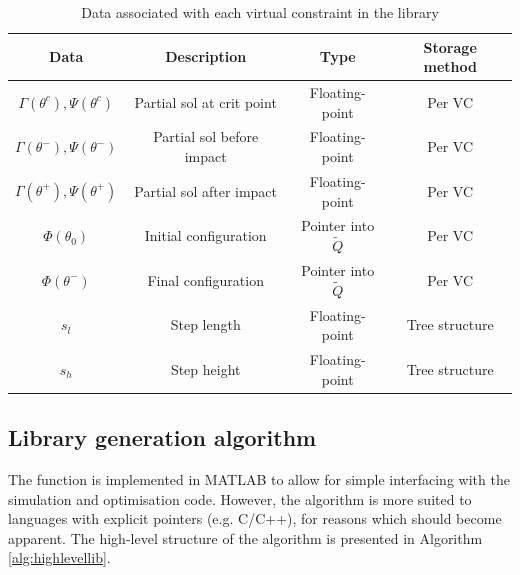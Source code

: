 \begin{table}
	\centering
	\begin{tabular}{ c | c | c | c }
		Data                               & Description               & Type                      & Storage method \\ \hline
		$\Gamma(\theta^c), \Psi(\theta^c)$ & Partial sol at crit point & Floating-point            & Per VC         \\
		$\Gamma(\theta^-), \Psi(\theta^-)$ & Partial sol before impact & Floating-point            & Per VC         \\
		$\Gamma(\theta^+), \Psi(\theta^+)$ & Partial sol after impact  & Floating-point            & Per VC         \\
		$\Phi(\theta_0)$                   & Initial configuration     & Pointer into $\tilde{Q}$  & Per VC         \\
		$\Phi(\theta^-)$                   & Final configuration       & Pointer into $\tilde{Q}$  & Per VC         \\
		$s_l$                              & Step length               & Floating-point            & Tree structure \\
		$s_h$                              & Step height               & Floating-point            & Tree structure
	\end{tabular}
	\caption{Data associated with each virtual constraint in the library}
	\label{tab:datavc}
\end{table}

\subsection{Library generation algorithm}
The  function is implemented in MATLAB to allow for simple interfacing with the simulation and optimisation code. However, the algorithm is more suited to languages with explicit pointers (e.g. C/C++), for reasons which should become apparent. The high-level structure of the algorithm is presented in Algorithm \ref{alg:highlevellib}.

